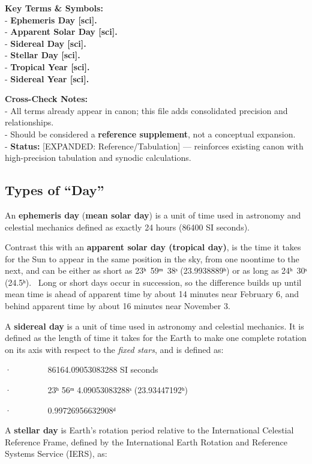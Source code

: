 \documentclass[
  letterpaper,
]{book}
\begin{document}
\textbf{Key Terms \& Symbols:}\\
- \textbf{Ephemeris Day {[}sci{]}.}\\
- \textbf{Apparent Solar Day {[}sci{]}.}\\
- \textbf{Sidereal Day {[}sci{]}.}\\
- \textbf{Stellar Day {[}sci{]}.}\\
- \textbf{Tropical Year {[}sci{]}.}\\
- \textbf{Sidereal Year {[}sci{]}.}

\textbf{Cross-Check Notes:}\\
- All terms already appear in canon; this file adds consolidated
precision and relationships.\\
- Should be considered a \textbf{reference supplement}, not a conceptual
expansion.\\
- \textbf{Status:} {[}EXPANDED: Reference/Tabulation{]} --- reinforces
existing canon with high-precision tabulation and synodic calculations.

\subsection{Types of ``Day''}\label{types-of-day}

An \textbf{ephemeris day} (\textbf{mean solar day}) is a unit of time
used in astronomy and celestial mechanics defined as exactly 24 hours
(86400 SI seconds).

Contrast this with an \textbf{apparent solar day (tropical day)}, is the
time it takes for the Sun to appear in the same position in the sky,
from one noontime to the next, and can be either as short as 23ʰ~59ᵐ~38ˢ
(23.9938889ʰ) or as long as 24ʰ~30ˢ (24.5ʰ).~ Long or short days occur
in succession, so the difference builds up until mean time is ahead of
apparent time by about 14 minutes near February 6, and behind apparent
time by about 16 minutes near November 3.

A \textbf{sidereal day} is a unit of time used in astronomy and
celestial mechanics. It is defined as the length of time it takes for
the Earth to make one complete rotation on its axis with respect to the
\emph{fixed stars}, and is defined as:

·~~~~~~~~ 86164.09053083288 SI seconds

·~~~~~~~~ 23ʰ 56ᵐ 4.09053083288ˢ (23.93447192ʰ)

·~~~~~~~~ 0.99726956632908ᵈ

A \textbf{stellar day} is Earth's rotation period relative to the
International Celestial Reference Frame, defined by the International
Earth Rotation and Reference Systems Service (IERS), as:
\end{document}
